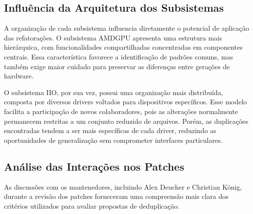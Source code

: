 \documentclass[twocolumn]{article}
\begin{document}
\subsection{Influência da Arquitetura dos Subsistemas}

A organização de cada subsistema influencia diretamente o potencial de aplicação das refatorações. O subsistema AMDGPU apresenta uma estrutura mais hierárquica, com funcionalidades compartilhadas concentradas em componentes centrais. Essa característica favorece a identificação de padrões comuns, mas também exige maior cuidado para preservar as diferenças entre gerações de hardware.

O subsistema IIO, por sua vez, possui uma organização mais distribuída, composta por diversos drivers voltados para dispositivos específicos. Esse modelo facilita a participação de novos colaboradores, pois as alterações normalmente permanecem restritas a um conjunto reduzido de arquivos. Porém, as duplicações encontradas tendem a ser mais específicas de cada driver, reduzindo as oportunidades de generalização sem comprometer interfaces particulares.

\subsection{Análise das Interações nos Patches}

As discussões com os mantenedores, incluindo Alex Deucher e Christian König, durante a revisão dos patches forneceram uma compreensão mais clara dos critérios utilizados para avaliar propostas de deduplicação.
\end{document}
